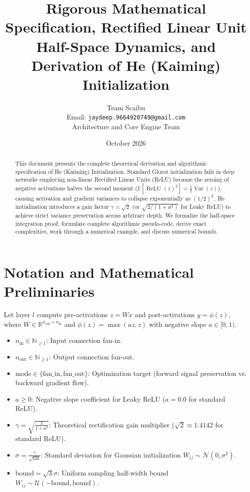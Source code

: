 \documentclass[11pt,a4paper]{article}
\title{\textbf{Rigorous Mathematical Specification, Rectified Linear Unit Half-Space Dynamics, and Derivation of He (Kaiming) Initialization}}
\author{Team Scaibu \\ \small Email: \texttt{jaydeep.9664920749@gmail.com} \\ \small Architecture and Core Engine Team}
\date{October 2026}
\theoremstyle{definition}
\begin{document}
\maketitle

\begin{abstract}
This document presents the complete theoretical derivation and algorithmic specification of He (Kaiming) Initialization. Standard Glorot initialization fails in deep networks employing non-linear Rectified Linear Units (ReLU) because the zeroing of negative activations halves the second moment ($\mathbb{E}[\operatorname{ReLU}(z)^2] = \frac{1}{2} \operatorname{Var}(z)$), causing activation and gradient variances to collapse exponentially as $(1/2)^L$. He initialization introduces a gain factor $\gamma = \sqrt{2}$ (or $\sqrt{2 / (1 + a^2)}$ for Leaky ReLU) to achieve strict variance preservation across arbitrary depth. We formalize the half-space integration proof, formulate complete algorithmic pseudo-code, derive exact complexities, work through a numerical example, and discuss numerical bounds.
\end{abstract}

\section{Notation and Mathematical Preliminaries}

Let layer $l$ compute pre-activations $z = W x$ and post-activations $y = \phi(z)$, where $W \in \mathbb{R}^{n_{\text{out}} \times n_{\text{in}}}$ and $\phi(z) = \max(a z, z)$ with negative slope $a \in [0, 1)$.

\begin{itemize}
    \item $n_{\text{in}} \in \mathbb{N}_{\ge 1}$: Input connection fan-in.
    \item $n_{\text{out}} \in \mathbb{N}_{\ge 1}$: Output connection fan-out.
    \item $\text{mode} \in \{\text{fan\_in}, \text{fan\_out}\}$: Optimization target (forward signal preservation vs. backward gradient flow).
    \item $a \ge 0$: Negative slope coefficient for Leaky ReLU ($a = 0.0$ for standard ReLU).
    \item $\gamma = \sqrt{\frac{2}{1 + a^2}}$: Theoretical rectification gain multiplier ($\sqrt{2} \approx 1.4142$ for standard ReLU).
    \item $\sigma = \frac{\gamma}{\sqrt{\text{fan}}}$: Standard deviation for Gaussian initialization $W_{ij} \sim \mathcal{N}(0, \sigma^2)$.
    \item $\text{bound} = \sqrt{3} \sigma$: Uniform sampling half-width bound $W_{ij} \sim \mathcal{U}(-\text{bound}, \text{bound})$.
\end{itemize}
\end{document}
